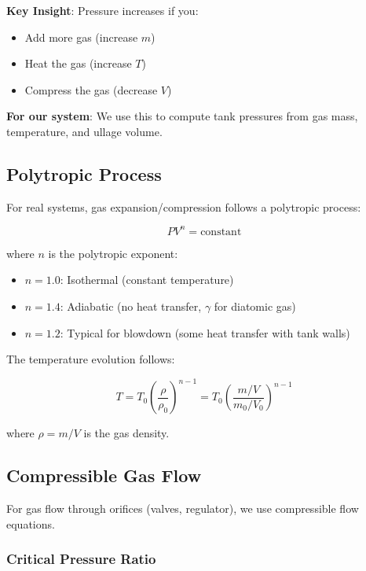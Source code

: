 \documentclass[11pt,a4paper]{article}
\begin{document}
\textbf{Key Insight}: Pressure increases if you:
\begin{itemize}
    \item Add more gas (increase $m$)
    \item Heat the gas (increase $T$)
    \item Compress the gas (decrease $V$)
\end{itemize}

\textbf{For our system}: We use this to compute tank pressures from gas mass, temperature, and ullage volume.

\subsection{Polytropic Process}

For real systems, gas expansion/compression follows a polytropic process:

\begin{equation}
PV^n = \text{constant}
\end{equation}

where $n$ is the polytropic exponent:
\begin{itemize}
    \item $n = 1.0$: Isothermal (constant temperature)
    \item $n = 1.4$: Adiabatic (no heat transfer, $\gamma$ for diatomic gas)
    \item $n = 1.2$: Typical for blowdown (some heat transfer with tank walls)
\end{itemize}

The temperature evolution follows:

\begin{equation}
T = T_0 \left(\frac{\rho}{\rho_0}\right)^{n-1} = T_0 \left(\frac{m/V}{m_0/V_0}\right)^{n-1}
\end{equation}

where $\rho = m/V$ is the gas density.

\subsection{Compressible Gas Flow}

For gas flow through orifices (valves, regulator), we use compressible flow equations.

\subsubsection{Critical Pressure Ratio}
\end{document}

